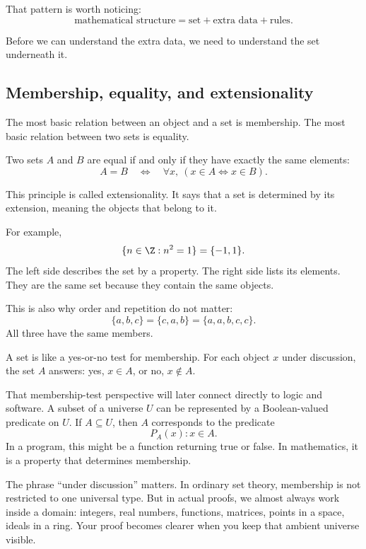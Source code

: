 That pattern is worth noticing:
\[
\text{mathematical structure}=\text{set}+\text{extra data}+\text{rules}.
\]

Before we can understand the extra data, we need to understand the set underneath it.

\subsection{Membership, equality, and extensionality}

The most basic relation between an object and a set is membership. The most basic relation between two sets is equality.

\begin{formalbox}
Two sets $A$ and $B$ are equal if and only if they have exactly the same elements:
\[
A=B \quad\Longleftrightarrow\quad \forall x,\ (x\in A\Longleftrightarrow x\in B).
\]
\end{formalbox}

This principle is called extensionality. It says that a set is determined by its extension, meaning the objects that belong to it.

For example,
\[
\{n\in\Z:n^2=1\}=\{-1,1\}.
\]
The left side describes the set by a property. The right side lists its elements. They are the same set because they contain the same objects.

This is also why order and repetition do not matter:
\[
\{a,b,c\}=\{c,a,b\}=\{a,a,b,c,c\}.
\]
All three have the same members.

\begin{intuitionbox}
A set is like a yes-or-no test for membership. For each object $x$ under discussion, the set $A$ answers: yes, $x\in A$, or no, $x\notin A$.
\end{intuitionbox}

That membership-test perspective will later connect directly to logic and software. A subset of a universe $U$ can be represented by a Boolean-valued predicate on $U$. If $A\subseteq U$, then $A$ corresponds to the predicate
\[
P_A(x): x\in A.
\]
In a program, this might be a function returning true or false. In mathematics, it is a property that determines membership.

The phrase ``under discussion'' matters. In ordinary set theory, membership is not restricted to one universal type. But in actual proofs, we almost always work inside a domain: integers, real numbers, functions, matrices, points in a space, ideals in a ring. Your proof becomes clearer when you keep that ambient universe visible.

